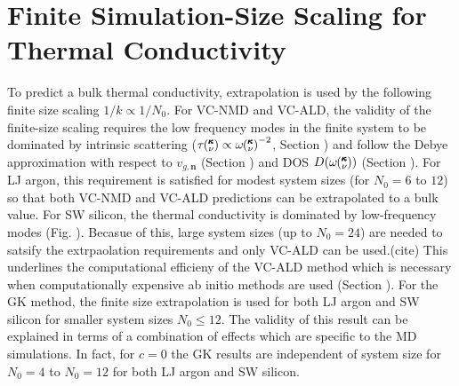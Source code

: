\documentclass[aps,prb,twocolumn,superscriptaddress,amsmath,amssymb,floatfix]{revtex4}
\newcommand{\kv}{\mspace{-4.0mu}\left(\mspace{-8.0mu}
\begin{smallmatrix}&\pmb{\kappa} \\&\nu\end{smallmatrix}
\mspace{-3.0mu}\right)}
\begin{document}
\section{\label{A:Finite Simulation-Size}
Finite Simulation-Size Scaling for Thermal 
Conductivity}
To predict a bulk thermal conductivity, extrapolation is used by the 
following finite size scaling $ 1 / k \propto 1/N_0$. For VC-NMD and 
VC-ALD, the validity of the finite-size scaling 
requires the low frequency modes in the finite system to be dominated by 
intrinsic scattering ($\tau\kv \propto \omega\kv^{-2}$, Section ) and  
follow the Debye approximation 
with respect to $v_{g,\mathbf{n}}$ (Section ) and DOS $D(\omega\kv)$ 
(Section ).\cite{shiomi_thermal_2011,esfarjani_heat_2011} For LJ 
argon, this requirement is satisfied for modest system sizes 
(for $N_0 = 6$ to $12$) so that both VC-NMD and VC-ALD predictions 
can be extrapolated to a bulk value. 
For SW silicon, the thermal conductivity is dominated by low-frequency 
modes (Fig. ). Becasue of this, large system sizes 
(up to $N_0 = 24$) are needed to satsify the 
extrpaolation requirements and only VC-ALD can be used.(cite) This 
underlines the computational efficieny of the VC-ALD method which is 
necessary when computationally expensive 
ab initio methods are used (Section ).
\cite{garg_role_2011,tian_phonon_2012,
lindsay_thermal_2012,esfarjani_heat_2011} 
For the GK method, the finite size extrapolation is used for 
both LJ argon and SW silicon for smaller system sizes $N_0 \le 12$. 
The validity of this result can be explained in terms of a 
combination of effects which are specific to the MD simulations.
\cite{esfarjani_heat_2011} In fact, for $c=0$ the GK results are independent 
of system size for $N_0 = 4$ to $N_0 = 12$ for both LJ argon and SW silicon.

\clearpage

%

\end{document}
